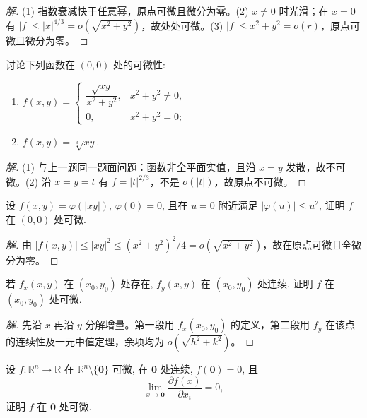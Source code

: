 \documentclass[../../数学分析培优讲义(答案版).tex]{subfiles}
\begin{document}
\begin{proof}[解]
(1) 指数衰减快于任意幂，原点可微且微分为零。(2) $x\ne0$ 时光滑；在 $x=0$ 有 $|f|\leq|x|^{4/3}=o(\sqrt{x^2+y^2})$，故处处可微。(3) $|f|\leq x^2+y^2=o(r)$，原点可微且微分为零。
\end{proof}

\begin{example}
讨论下列函数在 $(0,0)$ 处的可微性:
\begin{enumerate}[label=(\arabic*)]
    \item $\displaystyle f(x,y)=\begin{cases}\dfrac{\sqrt{xy}}{x^2+y^2},&x^2+y^2\ne0,\\0,&x^2+y^2=0;\end{cases}$
    \item $f(x,y)=\sqrt[3]{xy}$.
\end{enumerate}
\end{example}

\begin{proof}[解]
(1) 与上一题同一题面问题：函数非全平面实值，且沿 $x=y$ 发散，故不可微。(2) 沿 $x=y=t$ 有 $f=|t|^{2/3}$，不是 $o(|t|)$，故原点不可微。
\end{proof}

\begin{example}
设 $f(x,y)=\varphi(|xy|)$, $\varphi(0)=0$, 且在 $u=0$ 附近满足 $|\varphi(u)|\leq u^2$, 证明 $f$ 在 $(0,0)$ 处可微.
\end{example}

\begin{proof}[解]
由 $|f(x,y)|\leq|xy|^2\leq(x^2+y^2)^2/4=o(\sqrt{x^2+y^2})$，故在原点可微且全微分为零。
\end{proof}

\begin{example}
若 $f_x(x,y)$ 在 $(x_0,y_0)$ 处存在, $f_y(x,y)$ 在 $(x_0,y_0)$ 处连续, 证明 $f$ 在 $(x_0,y_0)$ 处可微.
\end{example}

\begin{proof}[解]
先沿 $x$ 再沿 $y$ 分解增量。第一段用 $f_x(x_0,y_0)$ 的定义，第二段用 $f_y$ 在该点的连续性及一元中值定理，余项均为 $o(\sqrt{h^2+k^2})$。
\end{proof}

\begin{example}
设 $f:\mathbb{R}^n\to\mathbb{R}$ 在 $\mathbb{R}^n\setminus\{\bm{0}\}$ 可微, 在 $\bm{0}$ 处连续, $f(\bm{0})=0$, 且
\[
    \lim\limits_{x\to\bm{0}}\dfrac{\partial f(x)}{\partial x_i}=0,
\]
证明 $f$ 在 $\bm{0}$ 处可微.
\end{example}
\end{document}
